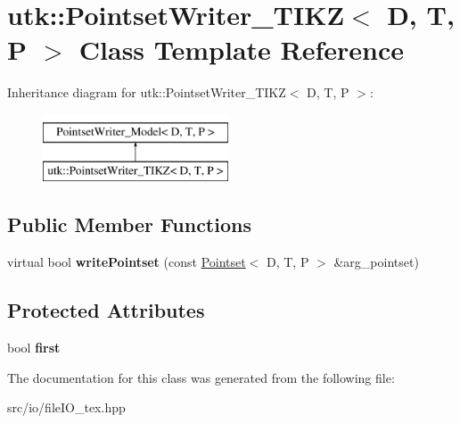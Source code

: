 \hypertarget{classutk_1_1PointsetWriter__TIKZ}{\section{utk\-:\-:Pointset\-Writer\-\_\-\-T\-I\-K\-Z$<$ D, T, P $>$ Class Template Reference}
\label{classutk_1_1PointsetWriter__TIKZ}
}
Inheritance diagram for utk\-:\-:Pointset\-Writer\-\_\-\-T\-I\-K\-Z$<$ D, T, P $>$\-:\begin{figure}[H]
\begin{center}
\leavevmode
\includegraphics[height=2.000000cm]{classutk_1_1PointsetWriter__TIKZ}
\end{center}
\end{figure}
\subsection*{Public Member Functions}
\begin{DoxyCompactItemize}
\item 
\hypertarget{classutk_1_1PointsetWriter__TIKZ_a75a327712c9ff9c8399f369f08d038a0}{virtual bool {\bfseries write\-Pointset} (const \hyperlink{classutk_1_1Pointset}{Pointset}$<$ D, T, P $>$ \&arg\-\_\-pointset)}\label{classutk_1_1PointsetWriter__TIKZ_a75a327712c9ff9c8399f369f08d038a0}

\end{DoxyCompactItemize}
\subsection*{Protected Attributes}
\begin{DoxyCompactItemize}
\item 
\hypertarget{classutk_1_1PointsetWriter__TIKZ_a14c55f843dd8b7999a6a260fbeb5738d}{bool {\bfseries first}}\label{classutk_1_1PointsetWriter__TIKZ_a14c55f843dd8b7999a6a260fbeb5738d}

\end{DoxyCompactItemize}


The documentation for this class was generated from the following file\-:\begin{DoxyCompactItemize}
\item 
src/io/file\-I\-O\-\_\-tex.\-hpp\end{DoxyCompactItemize}
